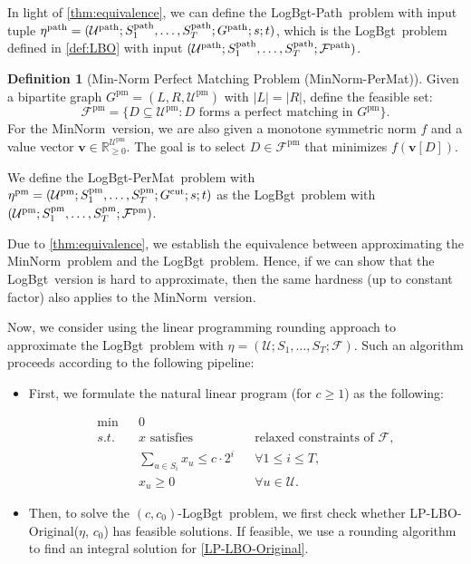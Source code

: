 \documentclass[11pt,a4paper]{article} \usepackage{enumitem}
\newcommand{\assigned}[1]{[ #1 ]}
\newcommand{\calF}{\mathcal{F}}
\newcommand{\calU}{\mathcal{U}}
\newcommand{\boldv}{\boldsymbol{v}}
\newcommand{\minnorm}{\textsf{MinNorm}}
\newcommand{\LBO}{\textsf{LogBgt}}
\newcommand{\minnormmatch}{\textsf{MinNorm-PerMat}}
\newcommand{\LBOmatch}{\textsf{LogBgt-PerMat}}
\newcommand{\LBOpath}{\textsf{LogBgt-Path}}
\newcommand{\pathU}{\operatorname{\calU^{path}}}
\newcommand{\pathS}[1]{\ifx\relax#1\relax
    S^{\operatorname{path}} \else
    S^{\operatorname{path}}_{#1} \fi
}
\newcommand{\pathF}{\operatorname{\calF^{path}}}
\newcommand{\patheta}{\operatorname{\eta^{path}}}
\newcommand{\pathG}{G^{\operatorname{path}}}
\newcommand{\pmU}{\operatorname{\calU^{pm}}}
\newcommand{\pmS}[1]{\ifx\relax#1\relax
    S^{\operatorname{pm}} \else
    S^{\operatorname{pm}}_{#1} \fi
}
\newcommand{\pmF}{\operatorname{\calF^{pm}}}
\newcommand{\pmeta}{\operatorname{\eta^{pm}}}
\newcommand{\pmG}{G^{\operatorname{pm}}}
\newcommand{\cutG}{G^{\operatorname{cut}}}
\theoremstyle{definition}
\newtheorem{definition}{Definition}[section]
\begin{document}
In light of \cref{thm:equivalence}, we can define the \LBOpath\ problem with input tuple $\patheta = (\pathU; \pathS{1}, \ldots, \pathS{T}; \pathG; s; t)$, which is the \LBO\ problem defined in \cref{def:LBO} 
with input $(\pathU; \pathS{1}, \ldots, \pathS{T}; \pathF)$.



\begin{definition}[Min-Norm Perfect Matching Problem (\minnormmatch)]
Given a bipartite graph $\pmG = (L, R, \pmU)$
with $|L|=|R|$, define the feasible set:
$$
\pmF = \{D \subseteq \pmU : D \text{ forms a perfect matching in }\pmG \}.
$$
For the \minnorm\ version, we are also given a monotone symmetric norm $f$ and a value vector $\boldv \in \mathbb{R}_{\geq 0}^{\pmU}$. The goal is to select $D \in \pmF$ that minimizes $f(\boldv\assigned{D})$.
\end{definition}
We define the \LBOmatch\ problem with $\pmeta = (\pmU; \pmS{1}, \ldots, \pmS{T}; \cutG; s; t)$ as the \LBO\ problem with $(\pmU; \pmS{1}, \ldots, \pmS{T}; \pmF)$.

Due to \cref{thm:equivalence}, we establish the equivalence between approximating the \minnorm\ problem and the \LBO\ problem. Hence, 
if we can show that the \LBO\ version is hard
to approximate, then the same hardness (up to constant factor) also applies to the \minnorm\ version. 

Now, we consider using the linear programming rounding approach to approximate
the \LBO\ problem with $\eta = (\calU; S_1, \ldots, S_T; \calF)$.
Such an algorithm proceeds according to 
the following pipeline:

\begin{itemize}
    \item 
 First, we formulate the natural linear program (for $c \geq 1$) as the following:

\begin{equation}
\begin{aligned}
    \min && 0 \\
    s.t. && \text{$x$ satisfies} && \text{relaxed constraints of } \calF, \\
    && \sum_{u \in S_i} x_u \leq c \cdot 2^i && \forall 1 \leq i \leq T, \\
    && x_u \geq 0 && \forall u \in \calU.
\end{aligned}
\tag{LP-LBO-Original($\eta$, $c$)}
\label{LP-LBO-Original}
\end{equation}


\item 
Then, to solve the $(c, c_0)$-\LBO\ problem, we first check whether LP-LBO-Original($\eta$, $c_0$) has feasible solutions. If feasible, we use a rounding algorithm to find an integral solution for \eqref{LP-LBO-Original}.
\end{itemize}
\end{document}
